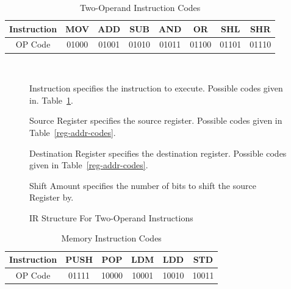 \documentclass[12pt]{article}
\theoremstyle{plain}
\theoremstyle{definition}
\begin{document}
    \begin{table}[H]
        \centering
        \begin{tabular}{|c|c|c|c|c|c|c|c|}
            \hline
            Instruction & MOV & ADD & SUB & AND & OR & SHL & SHR \\ \hline
            OP Code     & 01000 & 01001 & 01010 & 01011 & 01100 & 01101 & 01110  \\ \hline
        \end{tabular}
        \caption{Two-Operand Instruction Codes}
        \label{Two_Op Opcodes}
    \end{table}
    
    \begin{figure}[H]
        \centering
        \caption{IR Structure For Two-Operand Instructions}
        \label{IR-2op}
        \vspace{0.5 cm}
        \\
        \vspace{0.5 cm}
        \begin{regdesc}\begin{reglist}
            \item [Instruction] specifies the instruction to execute. Possible codes given in. Table~\ref{Two_Op Opcodes}.
            \item [Source Register] specifies the source register. Possible codes given in Table~\ref{reg-addr-codes}.
            \item [Destination Register] specifies the destination register. Possible codes given in Table~\ref{reg-addr-codes}.
            \item [Shift Amount] specifies the number of bits to shift the source Register by.
        \end{reglist}\end{regdesc}
    \end{figure}
    \begin{table}[H]
        \centering
        \begin{tabular}{|c|c|c|c|c|c|}
            \hline
            Instruction & PUSH  & POP  & LDM  & LDD  & STD   \\ \hline
            OP Code     & 01111 & 10000 & 10001 & 10010 & 10011 \\ \hline
        \end{tabular}
        \caption{Memory Instruction Codes}
        \label{memory opCodes}
    \end{table}
\end{document}
